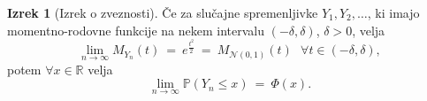 \documentclass[11pt]{article}
\newcommand{\p}{\mathbb{P}}
\newcommand{\R}{\mathbb{R}}
\newcommand{\1}{\mathbbm{1}}
\newcommand{\n}{\mathcal{N}}
\theoremstyle{definition}
\theoremstyle{definition}
\theoremstyle{definition}
\newtheorem{izrek}{Izrek}[section]
\begin{document}
\begin{izrek}[Izrek o zveznosti]

Če za slučajne spremenljivke $Y_1, Y_2, \ldots$, ki imajo momentno-rodovne funkcije na nekem intervalu $(-\delta, \delta)$, $\delta>0$, velja
$$\lim_{n \rightarrow \infty} M_{Y_n}(t) ~=~ e^{\frac{t^2}{2}} ~=~ M_{\n(0, 1)}(t) ~~~\forall t \in (-\delta, \delta),$$
potem $\forall x \in \R$ velja
$$\lim_{n \rightarrow \infty} \p(Y_n \leq x) ~=~ \Phi(x).$$

\end{izrek}
\vspace{0.5cm}

\pagebreak

\end{document}
